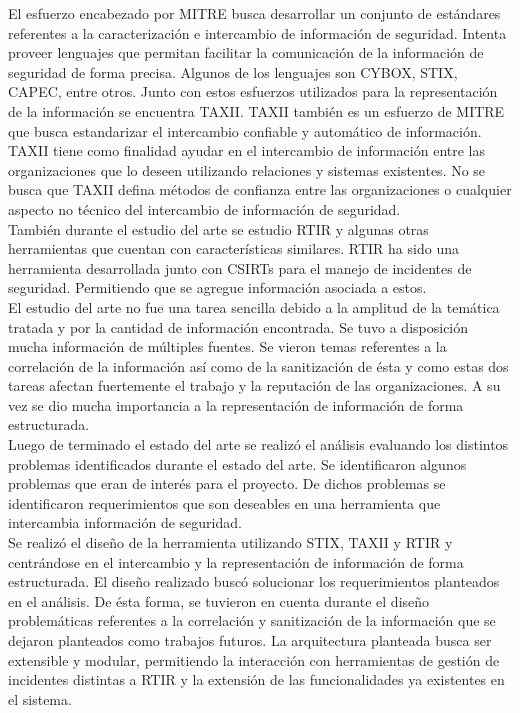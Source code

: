 El esfuerzo encabezado por MITRE busca desarrollar un conjunto de estándares referentes a la caracterización e intercambio de información de seguridad. Intenta proveer lenguajes que permitan facilitar la comunicación de la información de seguridad de forma precisa. Algunos de los lenguajes son CYBOX, STIX, CAPEC, entre otros. Junto con estos esfuerzos utilizados para la representación de la información se encuentra TAXII. TAXII también es un esfuerzo de MITRE que busca estandarizar el intercambio confiable y automático de información. TAXII tiene como finalidad ayudar en el intercambio de información entre las organizaciones que lo deseen utilizando relaciones y sistemas existentes. No se busca que TAXII defina métodos de confianza entre las organizaciones o cualquier aspecto no técnico del intercambio de información de seguridad.\\
\bigskip
También durante el estudio del arte se estudio RTIR y algunas otras herramientas que cuentan con características similares. RTIR ha sido una herramienta desarrollada junto con CSIRTs para el manejo de incidentes de seguridad. Permitiendo que se agregue información asociada a estos.\\
\bigskip
El estudio del arte no fue una tarea sencilla debido a la amplitud de la temática tratada y por la cantidad de información encontrada. Se tuvo a disposición mucha información de múltiples fuentes. Se vieron temas referentes a la correlación de la información así como de la sanitización de ésta y como estas dos tareas afectan fuertemente el trabajo y la reputación de las organizaciones. A su vez se dio mucha importancia a la representación de información de forma estructurada.\\
\bigskip
Luego de terminado el estado del arte se realizó el análisis evaluando los distintos problemas identificados durante el estado del arte. Se identificaron algunos problemas que eran de interés para el proyecto. De dichos problemas se identificaron requerimientos que son deseables en una herramienta que intercambia información de seguridad.\\
\bigskip
Se realizó el diseño de la herramienta utilizando STIX, TAXII y RTIR y centrándose en el intercambio y la representación de información de forma estructurada. El diseño realizado buscó solucionar los requerimientos planteados en el análisis. De ésta forma, se tuvieron en cuenta durante el diseño problemáticas referentes a la correlación y sanitización de la información que se dejaron planteados como trabajos futuros. La arquitectura planteada busca ser extensible y modular, permitiendo la interacción con herramientas de gestión de incidentes distintas a RTIR y la extensión de las funcionalidades ya existentes en el sistema.\\

